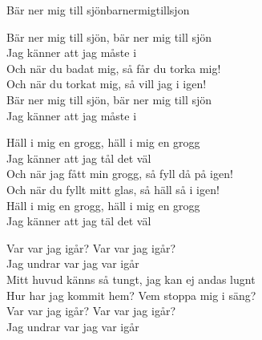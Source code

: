 \begin{song}{Bär ner mig till sjön}{barnermigtillsjon}
\begin{vers}
\repopen Bär ner mig till sjön, bär ner mig till sjön\\
Jag känner att jag måste i \repclose\\
Och när du badat mig, så får du torka mig!\\
Och när du torkat mig, så vill jag i igen!\\
Bär ner mig till sjön, bär ner mig till sjön\\
Jag känner att jag måste i\\
\end{vers}
\begin{vers}
\repopen Häll i mig en grogg, häll i mig en grogg\\
Jag känner att jag tål det väl \repclose\\
Och när jag fått min grogg, så fyll då på igen!\\
Och när du fyllt mitt glas, så häll så i igen!\\
Häll i mig en grogg, häll i mig en grogg\\
Jag känner att jag täl det väl\\
\end{vers}
\begin{vers}
\repopen Var var jag igår? Var var jag igår?\\
Jag undrar var jag var igår \repclose\\
Mitt huvud känns så tungt, jag kan ej andas lugnt\\
Hur har jag kommit hem? Vem stoppa mig i säng?\\
Var var jag igår? Var var jag igår?\\
Jag undrar var jag var igår\\
\end{vers}
\end{song}
